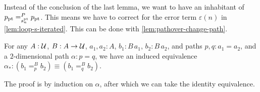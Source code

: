 \documentclass[a4,12pt]{amsart}
\begin{document}
Instead of the conclusion of the last lemma, we want to have
an inhabitant of $p_{\mathord{\mathrm{pt}}} =^P_{s^{\mathord{\mathrm{pt}}}_n} p_{\mathord{\mathrm{pt}}}$. This means we have
to correct for the error term $\varepsilon(n)$ in \cref{lem:loop-s-iterated}.
This can be done with \cref{lem:pathover-change-path}.

\begin{lemma}\label{lem:pathover-change-path}
  For any $A : \mathcal{U}$, $B : A \to \mathcal{U}$, $a_1,a_2 : A$, $b_1 : B\,a_1$, $b_2: B\,a_2$,
  and paths $p,q:a_1=a_2$, and a $2$-dimensional path $\alpha : p = q$,
  we have an induced equivalence $\alpha_* : (b_1 =^B_p b_2) \equiv (b_1 =^B_q b_2)$.
\end{lemma}
The proof is by induction on $\alpha$, after which we can take the identity equivalence.





\end{document}
